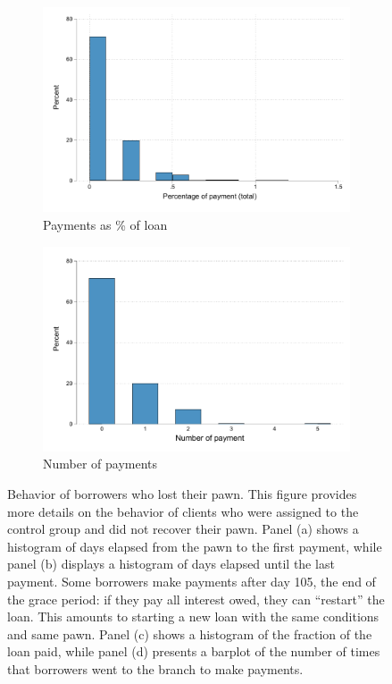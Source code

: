 \begin{appendix}
\begin{figure}[!h]
\begin{center}
\begin{subfigure}{0.35\textwidth}
    \end{subfigure}
        \begin{subfigure}{0.35\textwidth}
        \caption{Payments as \% of loan}
        \centering
        \includegraphics[width=\textwidth]{Figuras/hist_percpay_default.pdf}
    \end{subfigure}
    \begin{subfigure}{0.35\textwidth}
        \caption{Number of payments}
        \centering
        \includegraphics[width=\textwidth]{Figuras/hist_numpay_default.pdf}
    \end{subfigure}
    \end{center}
        \caption{Behavior of borrowers who lost their pawn. This figure provides more details on the behavior of clients who were assigned to the control group and did not recover their pawn. Panel (a) shows a histogram of days elapsed from the pawn to the first payment, while panel (b) displays a histogram of days elapsed until the last payment. Some borrowers make payments after day 105, the end of the grace period: if they pay all interest owed, they can ``restart'' the loan. This amounts to starting a new loan with the same conditions and same pawn. Panel (c) shows a histogram of the fraction of the loan paid, while panel (d) presents a barplot of the number of times that borrowers went to the branch to make payments.}
        \label{proxy_naive}
\end{figure}



\end{appendix}
